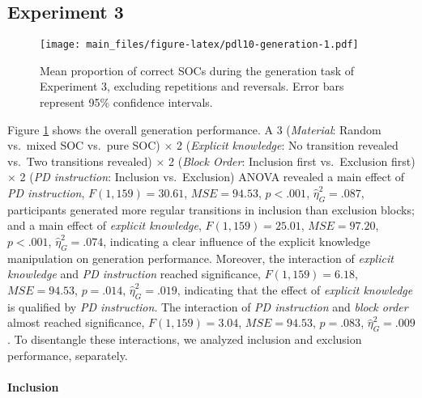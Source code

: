 \documentclass[man]{apa6}
\theoremstyle{definition}
\theoremstyle{definition}
\theoremstyle{definition}
\theoremstyle{remark}
\begin{document}
\begin{appendix}
\subsection{Experiment 3}\label{experiment-3}

\begin{figure}
\centering
\texttt{[image: main\_files/figure-latex/pdl10-generation-1.pdf]}
\caption{\label{fig:pdl10-generation}Mean proportion of correct SOCs during
the generation task of Experiment 3, excluding repetitions and
reversals. Error bars represent 95\% confidence intervals.}
\end{figure}

Figure \ref{fig:pdl10-generation} shows the overall generation
performance. A 3 (\emph{Material}: Random vs.~mixed SOC vs.~pure SOC)
\(\times\) 2 (\emph{Explicit knowledge}: No transition revealed vs.~Two
transitions revealed) \(\times\) 2 (\emph{Block Order}: Inclusion first
vs.~Exclusion first) \(\times\) 2 (\emph{PD instruction}: Inclusion
vs.~Exclusion) ANOVA revealed a main effect of \emph{PD instruction},
\(F(1, 159) = 30.61\), \(\mathit{MSE} = 94.53\), \(p < .001\),
\(\hat{\eta}^2_G = .087\), participants generated more regular
transitions in inclusion than exclusion blocks; and a main effect of
\emph{explicit knowledge}, \(F(1, 159) = 25.01\),
\(\mathit{MSE} = 97.20\), \(p < .001\), \(\hat{\eta}^2_G = .074\),
indicating a clear influence of the explicit knowledge manipulation on
generation performance. Moreover, the interaction of \emph{explicit
knowledge} and \emph{PD instruction} reached significance,
\(F(1, 159) = 6.18\), \(\mathit{MSE} = 94.53\), \(p = .014\),
\(\hat{\eta}^2_G = .019\), indicating that the effect of \emph{explicit
knowledge} is qualified by \emph{PD instruction}. The interaction of
\emph{PD instruction} and \emph{block order} almost reached
significance, \(F(1, 159) = 3.04\), \(\mathit{MSE} = 94.53\),
\(p = .083\), \(\hat{\eta}^2_G = .009\). To disentangle these
interactions, we analyzed inclusion and exclusion performance,
separately.

\paragraph{Inclusion}\label{inclusion-1}


\end{appendix}
\end{document}
